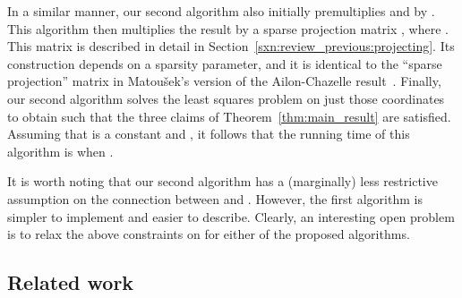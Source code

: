 \documentclass[11pt]{article}
\begin{document}
In a similar manner, our second algorithm also initially premultiplies  and  by . This algorithm then multiplies the result by a  sparse projection matrix , where . This matrix  is described in detail in Section~\ref{sxn:review_previous:projecting}. Its construction depends on a sparsity parameter, and it is identical to the ``sparse
projection'' matrix in Matou\v{s}ek's version of the Ailon-Chazelle result~\cite{AC06,Matousek08_RSA}. Finally, our second algorithm solves the least squares problem on just those  coordinates to
obtain  such that the three claims of Theorem~\ref{thm:main_result} are satisfied. Assuming that  is a constant and , it follows that the running time of this algorithm is  when .

It is worth noting that our second algorithm has a (marginally) less restrictive assumption on the connection between  and . However, the first algorithm is simpler to implement and easier to describe. Clearly, an interesting open problem is to relax the above constraints on  for either of the proposed algorithms.

\subsection{Related work}
\end{document}
